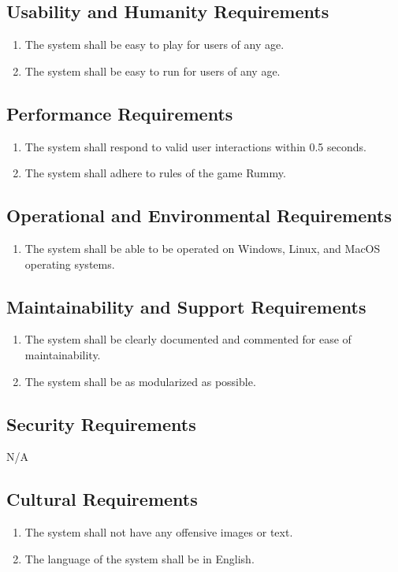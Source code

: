 \documentclass[12pt, titlepage]{article}
\begin{document}
\subsection{Usability and Humanity Requirements}
\begin{enumerate}[{UH}.1]
    \item The system shall be easy to play for users of any age.
    \item The system shall be easy to run for users of any age.
\end{enumerate}

\subsection{Performance Requirements}
\begin{enumerate}[{P}.1]
    \item The system shall respond to valid user interactions within 0.5 seconds.
    \item The system shall adhere to rules of the game Rummy.
\end{enumerate}

\subsection{Operational and Environmental Requirements}
\begin{enumerate}[{OE}.1]
    \item The system shall be able to be operated on Windows, Linux, and MacOS operating systems.
\end{enumerate}

\subsection{Maintainability and Support Requirements}
\begin{enumerate}[{MS}.1]
    \item The system shall be clearly documented and commented for ease of maintainability.
    \item The system shall be as modularized as possible.
\end{enumerate}

\subsection{Security Requirements}
N/A

\subsection{Cultural Requirements}
\begin{enumerate}[{C}.1]
    \item The system shall not have any offensive images or text.
    \item The language of the system shall be in English.
\end{enumerate}
\end{document}
